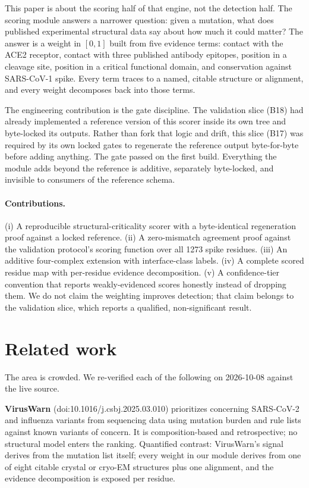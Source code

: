 \documentclass[11pt]{article}
\begin{document}
This paper is about the scoring half of that engine, not the detection half. The scoring module answers a narrower question: given a mutation, what does published experimental structural data say about how much it could matter? The answer is a weight in $[0,1]$ built from five evidence terms: contact with the ACE2 receptor, contact with three published antibody epitopes, position in a cleavage site, position in a critical functional domain, and conservation against SARS-CoV-1 spike. Every term traces to a named, citable structure or alignment, and every weight decomposes back into those terms.

The engineering contribution is the gate discipline. The validation slice (B18) had already implemented a reference version of this scorer inside its own tree and byte-locked its outputs. Rather than fork that logic and drift, this slice (B17) was required by its own locked gates to regenerate the reference output byte-for-byte before adding anything. The gate passed on the first build. Everything the module adds beyond the reference is additive, separately byte-locked, and invisible to consumers of the reference schema.

\paragraph{Contributions.} (i) A reproducible structural-criticality scorer with a byte-identical regeneration proof against a locked reference. (ii) A zero-mismatch agreement proof against the validation protocol's scoring function over all 1273 spike residues. (iii) An additive four-complex extension with interface-class labels. (iv) A complete scored residue map with per-residue evidence decomposition. (v) A confidence-tier convention that reports weakly-evidenced scores honestly instead of dropping them. We do not claim the weighting improves detection; that claim belongs to the validation slice, which reports a qualified, non-significant result.

\section{Related work}
The area is crowded. We re-verified each of the following on 2026-10-08 against the live source.

\textbf{VirusWarn} (doi:10.1016/j.csbj.2025.03.010) prioritizes concerning SARS-CoV-2 and influenza variants from sequencing data using mutation burden and rule lists against known variants of concern. It is composition-based and retrospective; no structural model enters the ranking. Quantified contrast: VirusWarn's signal derives from the mutation list itself; every weight in our module derives from one of eight citable crystal or cryo-EM structures plus one alignment, and the evidence decomposition is exposed per residue.
\end{document}
